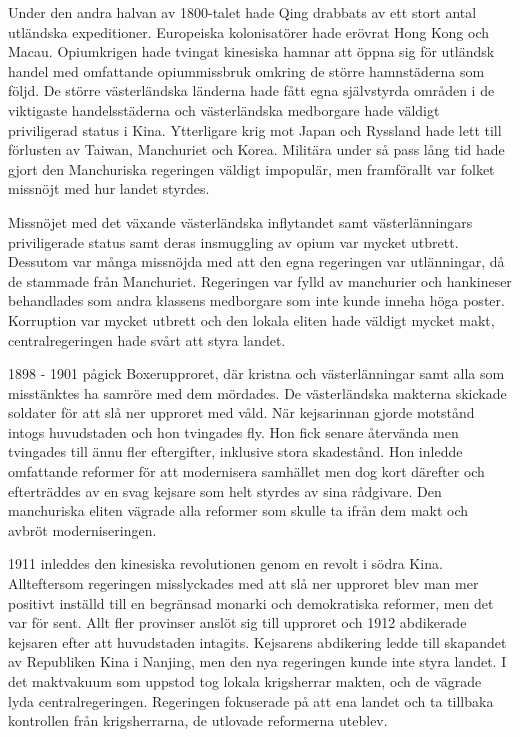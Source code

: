 \documentclass[a4paper,10pt]{article}
\begin{document}
Under den andra halvan av 1800-talet hade Qing drabbats av ett stort antal utländska expeditioner. Europeiska kolonisatörer hade erövrat Hong Kong och Macau. Opiumkrigen hade tvingat kinesiska hamnar att öppna sig för utländsk handel med omfattande opiummissbruk omkring de större hamnstäderna som följd. De större västerländska länderna hade fått egna självstyrda områden i de viktigaste handelsstäderna och västerländska medborgare hade väldigt priviligerad status i Kina. Ytterligare krig mot Japan och Ryssland hade lett till förlusten av Taiwan, Manchuriet och Korea. Militära under så pass lång tid hade gjort den Manchuriska regeringen väldigt impopulär, men framförallt var folket missnöjt med hur landet styrdes. 

Missnöjet med det växande västerländska inflytandet samt västerlänningars priviligerade status samt deras insmuggling av opium var mycket utbrett. Dessutom var många missnöjda med att den egna regeringen var utlänningar, då de stammade från Manchuriet. Regeringen var fylld av manchurier och hankineser behandlades som andra klassens medborgare som inte kunde inneha höga poster. Korruption var mycket utbrett och den lokala eliten hade väldigt mycket makt, centralregeringen hade svårt att styra landet. 

1898 - 1901 pågick Boxerupproret, där kristna och västerlänningar samt alla som misstänktes ha samröre med dem mördades. De västerländska makterna skickade soldater för att slå ner upproret med våld. När kejsarinnan gjorde motstånd intogs huvudstaden och hon tvingades fly. Hon fick senare återvända men tvingades till ännu fler eftergifter, inklusive stora skadestånd. Hon inledde omfattande reformer för att modernisera samhället men dog kort därefter och efterträddes av en svag kejsare som helt styrdes av sina rådgivare. Den manchuriska eliten vägrade alla reformer som skulle ta ifrån dem makt och avbröt moderniseringen.

1911 inleddes den kinesiska revolutionen genom en revolt i södra Kina. Allteftersom regeringen misslyckades med att slå ner upproret blev man mer positivt inställd till en begränsad monarki och demokratiska reformer, men det var för sent. Allt fler provinser anslöt sig till upproret och 1912 abdikerade kejsaren efter att huvudstaden intagits. Kejsarens abdikering ledde till skapandet av Republiken Kina i Nanjing, men den nya regeringen kunde inte styra landet. I det maktvakuum som uppstod tog lokala krigsherrar makten, och de vägrade lyda centralregeringen. Regeringen fokuserade på att ena landet och ta tillbaka kontrollen från krigsherrarna, de utlovade reformerna uteblev.
\end{document}
